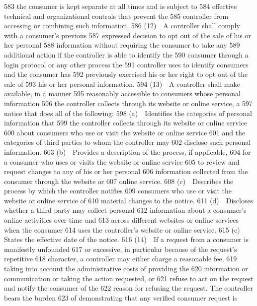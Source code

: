   583  the consumer is kept separate at all times and is subject to
  584  effective technical and organizational controls that prevent the
  585  controller from accessing or combining such information.
  586         (12) A controller shall comply with a consumer’s previous
  587  expressed decision to opt out of the sale of his or her personal
  588  information without requiring the consumer to take any
  589  additional action if the controller is able to identify the
  590  consumer through a login protocol or any other process the
  591  controller uses to identify consumers and the consumer has
  592  previously exercised his or her right to opt out of the sale of
  593  his or her personal information.
  594         (13) A controller shall make available, in a manner
  595  reasonably accessible to consumers whose personal information
  596  the controller collects through its website or online service, a
  597  notice that does all of the following:
  598         (a) Identifies the categories of personal information that
  599  the controller collects through its website or online service
  600  about consumers who use or visit the website or online service
  601  and the categories of third parties to whom the controller may
  602  disclose such personal information.
  603         (b) Provides a description of the process, if applicable,
  604  for a consumer who uses or visits the website or online service
  605  to review and request changes to any of his or her personal
  606  information collected from the consumer through the website or
  607  online service.
  608         (c) Describes the process by which the controller notifies
  609  consumers who use or visit the website or online service of
  610  material changes to the notice.
  611         (d) Discloses whether a third party may collect personal
  612  information about a consumer’s online activities over time and
  613  across different websites or online services when the consumer
  614  uses the controller’s website or online service.
  615         (e) States the effective date of the notice.
  616         (14) If a request from a consumer is manifestly unfounded
  617  or excessive, in particular because of the request’s repetitive
  618  character, a controller may either charge a reasonable fee,
  619  taking into account the administrative costs of providing the
  620  information or communication or taking the action requested, or
  621  refuse to act on the request and notify the consumer of the
  622  reason for refusing the request. The controller bears the burden
  623  of demonstrating that any verified consumer request is
